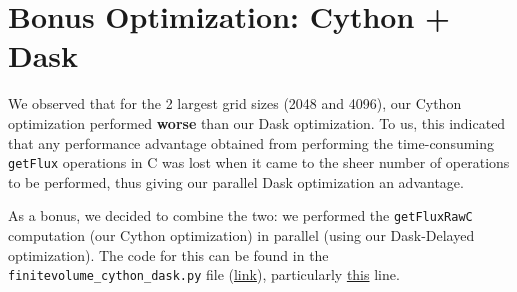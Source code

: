 \documentclass[a4paper,10pt]{article}
\begin{document}
\section{Bonus Optimization: Cython + Dask}
We observed that for the 2 largest grid sizes (2048 and 4096), our Cython optimization performed \textbf{worse} than our Dask optimization.
To us, this indicated that any performance advantage obtained from performing the time-consuming \verb|getFlux| operations in C was lost when it came to the sheer number of operations to be performed, thus giving our parallel Dask optimization an advantage.

As a bonus, we decided to combine the two: we performed the \verb|getFluxRawC| computation (our Cython optimization) in parallel (using our Dask-Delayed optimization).
The code for this can be found in the \verb|finitevolume_cython_dask.py| file (\href{https://github.com/paulmyr/DD2358-HPC25/blob/master/10_project_rishi_paul/code/cython/finitevolume_cython_dask.py}{link}), particularly \href{https://github.com/paulmyr/DD2358-HPC25/blob/master/10_project_rishi_paul/code/cython/finitevolume_cython_dask.py\#L305}{this} line.
\end{document}
